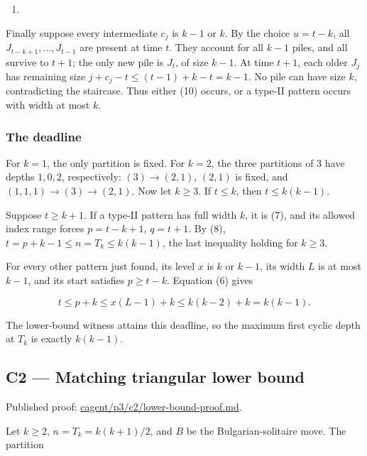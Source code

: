 \documentclass[11pt,a4paper]{article}
\providecommand{\tightlist}{\setlength{\itemsep}{0pt}\setlength{\parskip}{0pt}}
\begin{document}
\begin{enumerate}
\def\labelenumi{(\arabic{enumi})}
\setcounter{enumi}{9}
\tightlist
\item
\end{enumerate}

Finally suppose every intermediate \(c_j\) is \(k-1\) or \(k\). By the choice \(u=t-k\), all \(J_{t-k+1},\ldots,J_{t-1}\) are present at time \(t\). They account for all \(k-1\) piles, and all survive to \(t+1\); the only new pile is \(J_t\), of size \(k-1\). At time \(t+1\), each older \(J_j\) has remaining size \(j+c_j-t\le (t-1)+k-t=k-1\). No pile can have size \(k\), contradicting the staircase. Thus either (10) occurs, or a type-II pattern occurs with width at most \(k\).

\subsubsection{The deadline}\label{the-deadline}

For \(k=1\), the only partition is fixed. For \(k=2\), the three partitions of \(3\) have depths \(1,0,2\), respectively: \((3)\to(2,1)\), \((2,1)\) is fixed, and \((1,1,1)\to(3)\to(2,1)\). Now let \(k\ge3\). If \(t\le k\), then \(t\le k(k-1)\).

Suppose \(t\ge k+1\). If a type-II pattern has full width \(k\), it is (7), and its allowed index range forces \(p=t-k+1\), \(q=t+1\). By (8), \(t=p+k-1\le n=T_k\le k(k-1)\), the last inequality holding for \(k\ge3\).

For every other pattern just found, its level \(x\) is \(k\) or \(k-1\), its width \(L\) is at most \(k-1\), and its start satisfies \(p\ge t-k\). Equation (6) gives

\[
t\le p+k\le x(L-1)+k\le k(k-2)+k=k(k-1).
\]

The lower-bound witness attains this deadline, so the maximum first cyclic depth at \(T_k\) is exactly \(k(k-1)\).

\subsection{C2 --- Matching triangular lower bound}\label{c2-matching-triangular-lower-bound}

Published proof: \href{https://github.com/mpelteshki/climbing-to-the-frontier/blob/212bba53b1818c08c40b8c4b48f636651eaf6410/cagent/p3/c2/lower-bound-proof.md}{cagent/p3/c2/lower-bound-proof.md}.

Let \(k\ge2\), \(n=T_k=k(k+1)/2\), and \(B\) be the Bulgarian-solitaire move. The partition
\end{document}
